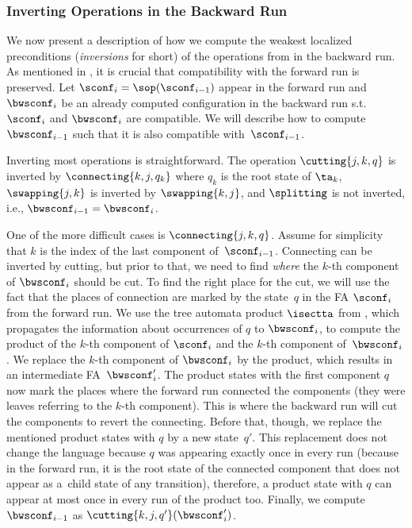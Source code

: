 \subsubsection*{Inverting Operations in the Backward Run}\label{sec:bwd_run}

We now present a description of how we compute the weakest localized preconditions
(\emph{inversions} for short) of the operations from  in the backward run.
As mentioned in , 
it is crucial that compatibility with the forward run is preserved. 
Let $\sconf_i = \sop(\sconf_{i-1})$ appear in the forward run and
$\bwsconf_{i}$ be an already computed configuration in the backward run
s.t.~$\sconf_i$ and $\bwsconf_i$ are compatible.
We will describe how to compute $\bwsconf_{i-1}$ such that it is also
compatible with~$\sconf_{i-1}$.

Inverting most operations is straightforward.
The operation $\cutting{j,k,q}$ is inverted by $\connecting{k,j,q_k}$ where $q_k$ is the root state of $\ta_k$,
$\swapping{j,k}$ is inverted by $\swapping{k,j}$, and $\splitting$ is not inverted, i.e., $\bwsconf_{i-1} = \bwsconf_i$.

One of the more difficult cases is 
$\connecting{j,k,q}$. %
Assume for simplicity that $k$ is the index of the last component of~$\sconf_{i-1}$.
%
Connecting can be inverted by cutting, but prior to that, we need to find
\emph{where} the $k$-th component of $\bwsconf_i$ should be cut.
To find the right place for the cut, we will
use the fact that the places of connection are marked by the
state~$q$ in the FA $\sconf_i$ from the forward run.
%
We use the tree automata product $\isectta$ from
, which
propagates the information about occurrences of $q$ to $\bwsconf_{i}$,
to compute the product of the $k$-th
component of $\sconf_{i}$ and the $k$-th component of~$\bwsconf_i$.
%
We replace the $k$-th component of $\bwsconf_i$ by the product, 
which results in an intermediate FA~$\bwsconf_i'$.
%
The product states with the first component $q$ now mark the places where the forward run connected the components (they were leaves referring to the $k$-th component).
%
This is where the backward run will cut the components to revert the connecting. 
%
Before that, though, we replace the mentioned product states with $q$ by a new state~$q'$.
This replacement does not change the language because $q$ was appearing
exactly once in every run (because in the forward run, it is the root state of
the connected component that does not appear as a~child state of any transition), therefore, 
a product state with $q$ can appear at most once in
every run of the product too.
%
Finally, we compute $\bwsconf_{i-1}$ as $\cutting{k,j,q'}(\bwsconf_i')$.

